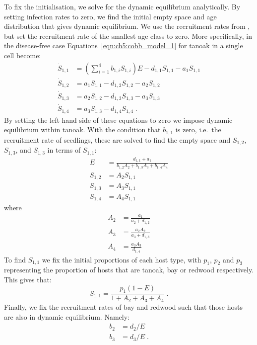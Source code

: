 To fix the initialisation, we solve for the dynamic equilibrium analytically. By setting infection rates to zero, we find the initial empty space and age distribution that gives dynamic equilibrium. We use the recruitment rates from \citet{cobb_ecosystem_2012}, but set the recruitment rate of the smallest age class to zero. More specifically, in the disease-free case Equations~\ref{eqn:ch5:cobb_model_1} for tanoak in a single cell become:
\begin{subequations}
\begin{align}
    \dot{S}_{1,1} &= \left(\sum_{i=1}^4b_{1,i}S_{1,i}\right)E - d_{1,1}S_{1,1} - a_1S_{1,1}\\
    \dot{S}_{1,2} &= a_1S_{1,1} - d_{1,2}S_{1,2} - a_2S_{1,2}\\
    \dot{S}_{1,3} &= a_2S_{1,2} - d_{1,3}S_{1,3} - a_3S_{1,3}\\
    \dot{S}_{1,4} &= a_3S_{1,3} - d_{1,4}S_{1,4} \;.
\end{align}
\end{subequations}
By setting the left hand side of these equations to zero we impose dynamic equilibrium within tanoak. With the condition that $b_{1,1}$ is zero, i.e.\ the recruitment rate of seedlings, these are solved to find the empty space and $S_{1,2}$, $S_{1,3}$, and $S_{1,3}$ in terms of $S_{1,1}$:
\begin{subequations}\label{eqn:ch5:tan_init}
    \begin{align}
        E &= \frac{d_{1,1} + a_1}{b_{1,2}A_2 + b_{1,3}A_3 + b_{1,4}A_4}\\
        S_{1,2} &= A_2S_{1,1}\\
        S_{1,3} &= A_3S_{1,1}\\
        S_{1,4} &= A_4S_{1,1}
    \end{align}
    \end{subequations}
where
\begin{subequations}
\begin{align}
    A_2 &= \frac{a_1}{a_2+d_{1,2}}\\
    A_3 &= \frac{a_2A_2}{a_3+d_{1,3}}\\
    A_4 &= \frac{a_3A_3}{d_{1,4}}
\end{align}
\end{subequations}
To find $S_{1,1}$ we fix the initial proportions of each host type, with $p_1$, $p_2$ and $p_3$ representing the proportion of hosts that are tanoak, bay or redwood respectively. This gives that:
\begin{equation}
    \label{eqn:ch5:tan_0_init}
    S_{1,1} = \frac{p_1(1-E)}{1+A_2+A_3+A_4}\;.
\end{equation}
Finally, we fix the recruitment rates of bay and redwood such that those hosts are also in dynamic equilibrium. Namely:
\begin{subequations}
\begin{align}
    b_2 &= d_2 / E \\
    b_3 &= d_3 / E \;.
\end{align}
\end{subequations}

